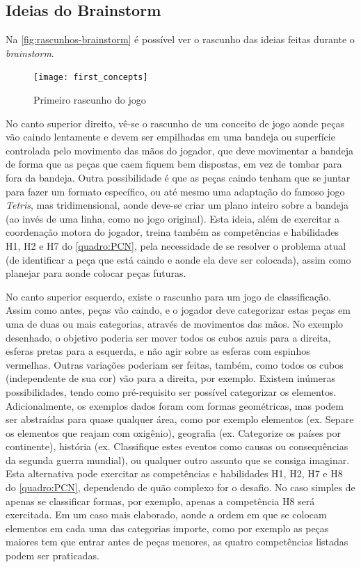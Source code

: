 \subsection{Ideias do Brainstorm}\label{subsec-ideias-brainstorm}

Na \autoref{fig:rascunhos-brainstorm} é possível ver o rascunho das ideias feitas durante o \textit{brainstorm}. 

\begin{figure}[h]
	\centering
	\caption{Primeiro rascunho do jogo}
	\texttt{[image: first\_concepts]}
	\legend{\fonteAP}
	\label{fig:rascunhos-brainstorm}
\end{figure}

No canto superior direito, vê-se o rascunho de um conceito de jogo aonde 
peças vão caindo lentamente e devem ser empilhadas em uma bandeja ou 
superfície controlada pelo movimento das mãos do jogador, que deve 
movimentar a bandeja de forma que as peças que caem fiquem bem dispostas, 
em vez de tombar para fora da bandeja. Outra possibilidade é que as 
peças caindo tenham que se juntar para fazer um formato específico, 
ou até mesmo uma adaptação do famoso jogo \textit{Tetris}, mas 
tridimensional, aonde deve-se criar um plano inteiro sobre a bandeja 
(ao invés de uma linha, como no jogo original). Esta ideia, além de
exercitar a coordenação motora do jogador, treina também as 
competências e habilidades H1, H2 e H7 do \autoref{quadro:PCN}, pela
necessidade de se resolver o problema atual (de identificar a 
peça que está caindo e aonde ela deve ser colocada), assim como planejar
para aonde colocar peças futuras.

No canto superior esquerdo, existe o rascunho para um jogo de 
classificação. Assim como antes, peças vão caindo, e o jogador 
deve categorizar estas peças em uma de duas ou mais categorias, 
através de movimentos das mãos. No exemplo desenhado, o 
objetivo poderia ser mover todos os cubos azuis para a direita, 
esferas pretas para a esquerda, e não agir sobre as esferas 
com espinhos vermelhas. Outras variações poderiam ser feitas, 
também, como todos os cubos (independente de sua cor) vão 
para a direita, por exemplo. Existem inúmeras possibilidades, 
tendo como pré-requisito ser possível categorizar os elementos. 
Adicionalmente, os exemplos dados foram com formas geométricas, 
mas podem ser abstraídas para quase qualquer área, como por 
exemplo elementos (ex. Separe os elementos que reajam com 
oxigênio), geografia (ex. Categorize os países por continente), 
história (ex. Classifique estes eventos como causas ou 
consequências da segunda guerra mundial), ou qualquer outro 
assunto que se consiga imaginar. Esta alternativa pode 
exercitar as competências e habilidades H1, H2, H7 e H8 do 
\autoref{quadro:PCN}, dependendo de quão complexo for o desafio. 
No caso simples de apenas se classificar formas, por exemplo,
apenas a competência H8 será exercitada. Em um caso mais elaborado, 
aonde a ordem em que se colocam elementos em cada uma das categorias 
importe, como por exemplo as peças maiores tem que entrar antes de 
peças menores, as quatro competências listadas podem ser praticadas.

